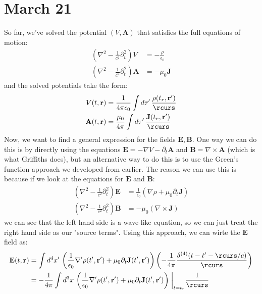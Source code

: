 \section{March 21}
So far, we've solved the potential \( (V, \mathbf{A}) \) that satisfies the full equations of motion:
\begin{align*}
	\left( \nabla^2 - \frac{1}{c^2}\partial_t^2 \right)V &= -\frac{\rho}{\epsilon_0}\\
	\left( \nabla^2 - \frac{1}{c^2}\partial_t^2 \right) \mathbf{A} &= -\mu_0 \mathbf{J}
\end{align*}
and the solved potentials take the form:
\begin{align*}
	V(t, \mathbf{r}) &= \frac{1}{4\pi \epsilon_0}\int d\tau' \, \frac{\rho(t_r, \mathbf{r}')}{\rcurs} \\ 
	\mathbf{A}(t, \mathbf{r}) &= \frac{\mu_0}{4\pi}\int d\tau' \, \frac{\mathbf{J}(t_r, \mathbf{r}')}{\rcurs} 
\end{align*}
Now, we want to find a general expression for the fields \( \mathbf{E}, \mathbf{B} \). One way we can do this
is by directly using the equations \( \mathbf{E} = -\nabla V - \partial_t \mathbf{A} \) and \( \mathbf{B} =
\nabla \times \mathbf{A} \) (which is what Griffiths does), but	an alternative way to do this is to use the
Green's function approach we developed from earlier. The reason we can use this is because if we look at the
equations for \( \mathbf{E} \) and \( \mathbf{B} \):
\begin{align*}
	\left( \nabla^2 - \frac{1}{c^2}\partial_t^2 \right)\mathbf{E} &= \frac{1}{\epsilon_0}(\nabla \rho + \mu_0
	\partial_t \mathbf{J}) \\ 
	\left( \nabla^2 - \frac{1}{c^2}\partial_t^2 \right)\mathbf{B} &= -\mu_0 (\nabla \times \mathbf{J})
\end{align*}
we can see that the left hand side is a wave-like equation, so we can just treat the right hand side as our
"source terms". Using this approach, we can wirte the \( \mathbf{E} \) field as:
\begin{align*}
	\mathbf{E}(t, \mathbf{r}) &= \int d^{4}x' \, \left( \frac{1}{\epsilon_0}\nabla' \rho(t', \mathbf{r}') +
	\mu_0 \partial_t \mathbf{J}(t', \mathbf{r}') \right)\left( -\frac{1}{4\pi} \frac{\delta^{(4)}(t - t' -
	\rcurs / c)}{\rcurs} \right)\\
	&= -\frac{1}{4\pi} \int d^3x \, \left( \frac{1}{\epsilon_0}\nabla' \rho(t', \mathbf{r}') + \mu_0 \partial_t
	\mathbf{J}(t', \mathbf{r}')\right)\eval_{t = t_r} \frac{1}{\rcurs} 
\end{align*}
